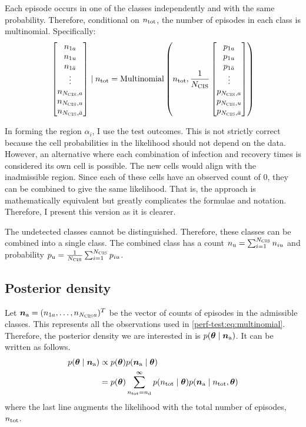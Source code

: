 \documentclass[thesis.tex]{subfiles}
\begin{document}
Each episode occurs in one of the classes independently and with the same probability.
Therefore, conditional on $n_\text{tot}$, the number of episodes in each class is multinomial.
Specifically:
\begin{align}
  \begin{bmatrix}
    n_{1a} \\ n_{1u} \\ n_{1\bar{a}} \\ \vdots \\ n_{N_\text{CIS},a} \\ n_{N_\text{CIS},u} \\ n_{N_\text{CIS},\bar{a}}
  \end{bmatrix}
  \mid n_\text{tot}
  =
  \operatorname{Multinomial}\left(
    n_\text{tot},
    \frac{1}{N_\text{CIS}}
    \begin{bmatrix}
      p_{1a} \\ p_{1u} \\ p_{1\bar{a}} \\ \vdots \\ p_{N_\text{CIS},a} \\ p_{N_\text{CIS},u} \\ p_{N_\text{CIS},\bar{a}}
    \end{bmatrix}
  \right)
  \label{perf-test:eq:multinomial}
\end{align}

In forming the region $\alpha_i$, I use the test outcomes.
This is not strictly correct because the cell probabilities in the likelihood should not depend on the data.
However, an alternative where each combination of infection and recovery times is considered its own cell is possible.
The new cells would align with the inadmissible region.
Since each of these cells have an observed count of 0, they can be combined to give the same likelihood.
That is, the approach is mathematically equivalent but greatly complicates the formulae and notation.
Therefore, I present this version as it is clearer.

The undetected classes cannot be distinguished.
Therefore, these classes can be combined into a single class.
The combined class has a count $n_\text{u} = \sum_{i=1}^{N_\text{CIS}} n_{iu}$ and probability $p_\text{u} = \frac{1}{N_\text{CIS}} \sum_{i=1}^{N_\text{CIS}} p_{iu}$.

\subsection{Posterior density} \label{perf-test:sec:posterior-density}

Let $\bm{n}_\text{a} = (n_{1a}, \dots, n_{N_\text{CIS} a})^T$ be the vector of counts of episodes in the admissible classes.
This represents all the observations used in \cref{perf-test:eq:multinomial}.
Therefore, the posterior density we are interested in is $p(\bm{\theta} \mid \bm{n}_\text{a})$.
It can be written as follows.
\begin{align}
p(\bm{\theta} \mid \bm{n}_\text{a})
&\propto p(\bm{\theta}) p(\bm{n}_\text{a} \mid \bm{\theta}) \\
&= p(\bm{\theta}) \sum_{n_\text{tot}=n_\text{d}}^\infty p(n_\text{tot} \mid \bm{\theta}) p(\bm{n}_\text{a} \mid n_\text{tot}, \bm{\theta})
\label{perf-test:eq:posterior1}
\end{align}
where the last line augments the likelihood with the total number of episodes, $n_\text{tot}$.
\end{document}
